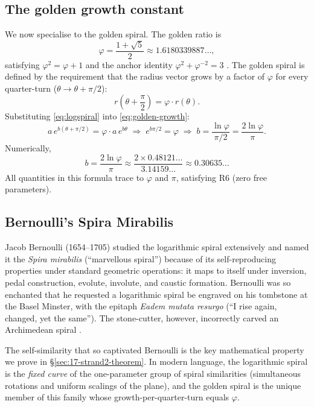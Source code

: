 \subsection{The golden growth constant}
\label{subsec:17-golden-b}

We now specialise to the golden spiral.  The golden ratio is
\[
  \varphi = \frac{1+\sqrt{5}}{2} \approx 1.6180339887\ldots,
\]
satisfying \(\varphi^2 = \varphi + 1\) and the anchor identity
\(\varphi^2 + \varphi^{-2} = 3\) \cite{zenodo_trinity}.  The
golden spiral is defined by the requirement that the radius
vector grows by a factor of \(\varphi\) for every quarter-turn
(\(\theta \to \theta + \pi/2\)):
\begin{equation}\label{eq:golden-growth}
  r\!\left(\theta + \frac{\pi}{2}\right) = \varphi \cdot r(\theta).
\end{equation}
Substituting \eqref{eq:logspiral} into \eqref{eq:golden-growth}:
\[
  a\,e^{b(\theta+\pi/2)} = \varphi \cdot a\,e^{b\theta}
  \;\Longrightarrow\;
  e^{b\pi/2} = \varphi
  \;\Longrightarrow\;
  b = \frac{\ln\varphi}{\pi/2} = \frac{2\ln\varphi}{\pi}.
\]
Numerically,
\begin{equation}\label{eq:bvalue}
  b = \frac{2\ln\varphi}{\pi} \approx \frac{2 \times 0.48121\ldots}{3.14159\ldots} \approx 0.30635\ldots
\end{equation}
All quantities in this formula trace to \(\varphi\) and \(\pi\),
satisfying R6 (zero free parameters).

\subsection{Bernoulli's Spira Mirabilis}
\label{subsec:17-bernoulli}

Jacob Bernoulli (1654--1705) studied the logarithmic spiral
extensively and named it the \emph{Spira mirabilis}
(``marvellous spiral'') because of its self-reproducing
properties under standard geometric operations: it maps to
itself under inversion, pedal construction, evolute, involute,
and caustic formation.  Bernoulli was so enchanted that he
requested a logarithmic spiral be engraved on his tombstone at
the Basel Minster, with the epitaph \emph{Eadem mutata resurgo}
(``I rise again, changed, yet the same'').  The stone-cutter,
however, incorrectly carved an Archimedean spiral
\cite{boyer_history}.

The self-similarity that so captivated Bernoulli is the
key mathematical property we prove in
\S\ref{sec:17-strand2-theorem}.  In modern language, the
logarithmic spiral is the \emph{fixed curve} of the one-parameter
group of spiral similarities (simultaneous rotations and
uniform scalings of the plane), and the golden spiral is the
unique member of this family whose growth-per-quarter-turn
equals \(\varphi\).

